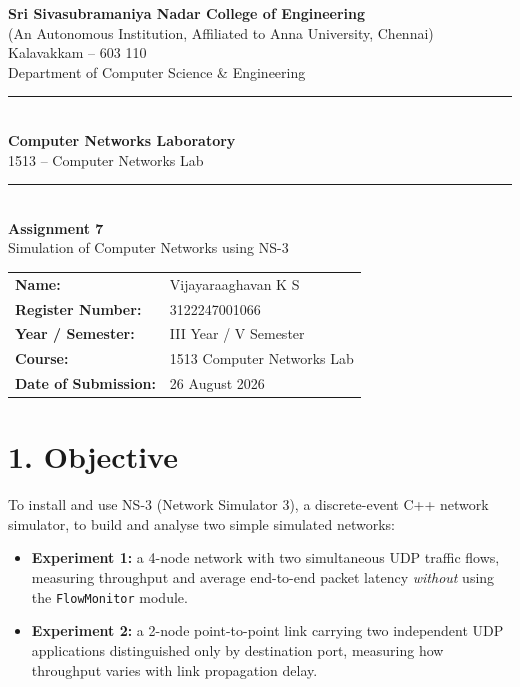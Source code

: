 \documentclass[11pt]{article}
\title{\vspace{-2cm}}
\date{}
\begin{document}
\begin{titlepage}
\centering
\vspace*{1cm}
{\large \textbf{Sri Sivasubramaniya Nadar College of Engineering}}\\
{\small (An Autonomous Institution, Affiliated to Anna University, Chennai)}\\
{\small Kalavakkam -- 603 110}\\[0.3cm]
{\small Department of Computer Science \& Engineering}\\[1.5cm]

\rule{\linewidth}{0.5mm}\\[0.4cm]
{\LARGE \textbf{Computer Networks Laboratory}}\\[0.3cm]
{\Large 1513 -- Computer Networks Lab}\\[0.4cm]
\rule{\linewidth}{0.5mm}\\[1.5cm]

{\huge \textbf{Assignment 7}}\\[0.4cm]
{\Large Simulation of Computer Networks using NS-3}\\[2cm]

\begin{center}
\begin{tabular}{ll}
\textbf{Name:} & Vijayaraaghavan K S \\[0.2cm]
\textbf{Register Number:} & 3122247001066 \\[0.2cm]
\textbf{Year / Semester:} & III Year / V Semester \\[0.2cm]
\textbf{Course:} & 1513 Computer Networks Lab \\[0.2cm]
\textbf{Date of Submission:} & 26 August 2026 \\[0.2cm]
\end{tabular}
\end{center}

\vfill
\end{titlepage}

\section*{1. Objective}
To install and use NS-3 (Network Simulator 3), a discrete-event C++ network
simulator, to build and analyse two simple simulated networks:
\begin{itemize}
  \item \textbf{Experiment 1:} a 4-node network with two simultaneous UDP
        traffic flows, measuring throughput and average end-to-end packet
        latency \emph{without} using the \texttt{FlowMonitor} module.
  \item \textbf{Experiment 2:} a 2-node point-to-point link carrying two
        independent UDP applications distinguished only by destination
        port, measuring how throughput varies with link propagation delay.
\end{itemize}
\end{document}
